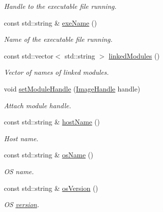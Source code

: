 \begin{DoxyCompactItemize}
\begin{DoxyCompactList}\small\item\em Handle to the executable file running. \item\end{DoxyCompactList}\item 
const std::string \& \hyperlink{namespaceSystem_aff38aaecd202e69eab2707a36adc8df8}{exeName} ()
\begin{DoxyCompactList}\small\item\em Name of the executable file running. \item\end{DoxyCompactList}\item 
const std::vector$<$ std::string $>$ \hyperlink{namespaceSystem_af1b504f8287b1957eeab91fb89cbd56f}{linkedModules} ()
\begin{DoxyCompactList}\small\item\em Vector of names of linked modules. \item\end{DoxyCompactList}\item 
void \hyperlink{namespaceSystem_af2318f71452b7e844f0b654a8bd93018}{setModuleHandle} (\hyperlink{namespaceSystem_a21dca3f6170a2b0a0ea3028040ba21b3}{ImageHandle} handle)
\begin{DoxyCompactList}\small\item\em Attach module handle. \item\end{DoxyCompactList}\item 
const std::string \& \hyperlink{namespaceSystem_a89320a729880098922e8b505db1137ec}{hostName} ()
\begin{DoxyCompactList}\small\item\em Host name. \item\end{DoxyCompactList}\item 
const std::string \& \hyperlink{namespaceSystem_a08f605cda93733c3b7593517ed18557c}{osName} ()
\begin{DoxyCompactList}\small\item\em OS name. \item\end{DoxyCompactList}\item 
const std::string \& \hyperlink{namespaceSystem_aee568b62f9bcad983dcb3f0c30631854}{osVersion} ()
\begin{DoxyCompactList}\small\item\em OS \hyperlink{namespaceversion}{version}. \item\end{DoxyCompactList}\item 

\end{DoxyCompactItemize}

